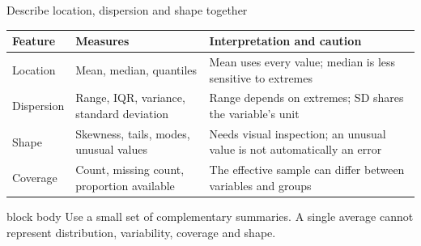 \documentclass[10pt,aspectratio=169]{beamer}
\begin{document}
\begin{frame}{Describe location, dispersion and shape together}

\scriptsize

\begin{tabularx}{\textwidth}{lXX}
\toprule
\textbf{Feature} & \textbf{Measures} & \textbf{Interpretation and caution} \\
\midrule
Location & Mean, median, quantiles & Mean uses every value; median is less sensitive to extremes \\
Dispersion & Range, IQR, variance, standard deviation & Range depends on extremes; SD shares the variable's unit \\
Shape & Skewness, tails, modes, unusual values & Needs visual inspection; an unusual value is not automatically an error \\
Coverage & Count, missing count, proportion available & The effective sample can differ between variables and groups \\
\bottomrule
\end{tabularx}

\vspace{0.40cm}

\small

\begin{beamercolorbox}[rounded=true,sep=8pt]{block body}
Use a small set of complementary summaries. A single average cannot represent distribution, variability, coverage and shape.
\end{beamercolorbox}

\end{frame}
\end{document}
